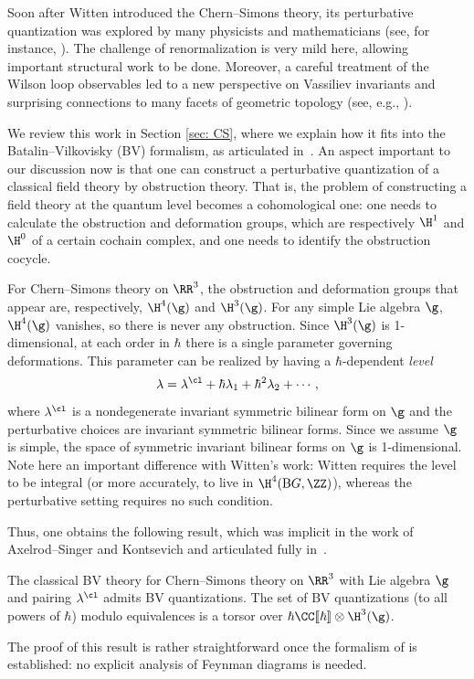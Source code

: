 \documentclass[10pt]{amsart}
\begin{document}
Soon after Witten introduced the Chern--Simons theory,
its perturbative quantization was explored by many physicists and mathematicians
(see, for instance, \cite{GMM,GuaBook,AxeSinI,AxeSinII,KonECM,BarCS}).
The challenge of renormalization is very mild here, 
allowing important structural work to be done. 
Moreover, a careful treatment of the Wilson loop observables
led to a new perspective on Vassiliev invariants and surprising connections to many facets of geometric topology (see, e.g., \cite{BarVI,AltFreVCS,BotTau,VolSurv}).

We review this work in Section \ref{sec: CS},
where we explain how it fits into the Batalin--Vilkovisky (BV) formalism,
as articulated in~\cite{CosBook}.
An aspect important to our discussion now is that one can construct a perturbative quantization of a classical field theory by obstruction theory.  
That is, the problem of constructing a field theory at the quantum level becomes a cohomological one: 
one needs to calculate the obstruction and deformation groups, 
which are respectively $\H^1$ and $\H^0$ of a certain cochain complex,
and one needs to identify the obstruction cocycle. 

For Chern--Simons theory on $\RR^3$, the obstruction and deformation groups that appear are, respectively, $\H^4(\g)$ and $\H^3(\g)$. 
For any simple Lie algebra $\g$, $\H^4(\g)$ vanishes, so there is never any obstruction. 
Since $\H^3(\g)$ is 1-dimensional, at each order in $\hbar$ there is a single parameter governing deformations. 
This parameter can be realized by having a $\hbar$-dependent {\em level} 
\[
\lambda = \lambda^\cl + \hbar \lambda_1 + \hbar^2 \lambda_2 + \cdots,
\]
where $\lambda^\cl$ is a nondegenerate invariant symmetric bilinear form on $\g$
and the perturbative choices are invariant symmetric bilinear forms.  Since we assume $\g$ is simple, the space of symmetric invariant bilinear forms on $\g$ is 1-dimensional. Note here an important difference with Witten's work: 
Witten requires the level to be integral (or more accurately, to live in $\H^4({\rm B} G,\ZZ)$), whereas the perturbative setting requires no such condition.

Thus, one obtains the following result,
which was implicit in the work of Axelrod--Singer and Kontsevich and articulated fully in~\cite{CosCS,CosBook}.

\begin{thm}
\label{thm: levels for CS}
The classical BV theory for Chern--Simons theory on $\RR^3$ with Lie algebra $\g$ and pairing $\lambda^\cl$ admits BV quantizations.
The set of BV quantizations (to all powers of $\hbar$) modulo equivalences is a torsor over $\hbar\CC[\![\hbar]\!] \otimes \H^3(\g)$.
\end{thm}
The proof of this result is rather straightforward once the formalism of \cite{CosBook} is established: no explicit analysis of Feynman diagrams is needed. 
\end{document}
